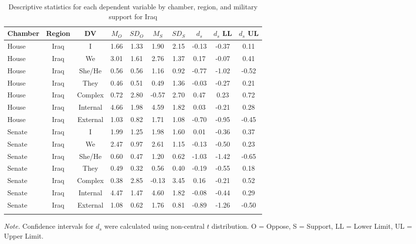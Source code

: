 \documentclass[english,,man,floatsintext]{apa6}
\begin{document}
\begin{table}[tbp]
\begin{center}
\begin{threeparttable}
\caption{\label{tab:Itable}Descriptive statistics for each dependent variable by chamber, 
          region, and military support for Iraq}
\small{
\begin{tabular}{lccccccccc}
\toprule
Chamber & Region & DV & $M_O$ & $SD_O$ & $M_S$ & $SD_S$ & $d_s$ & $d_s$ LL & $d_s$ UL\\
\midrule
House & Iraq & I & 1.66 & 1.33 & 1.90 & 2.15 & -0.13 & -0.37 & 0.11\\
House & Iraq & We & 3.01 & 1.61 & 2.76 & 1.37 & 0.17 & -0.07 & 0.41\\
House & Iraq & She/He & 0.56 & 0.56 & 1.16 & 0.92 & -0.77 & -1.02 & -0.52\\
House & Iraq & They & 0.46 & 0.51 & 0.49 & 1.36 & -0.03 & -0.27 & 0.21\\
House & Iraq & Complex & 0.72 & 2.80 & -0.57 & 2.70 & 0.47 & 0.23 & 0.72\\
House & Iraq & Internal & 4.66 & 1.98 & 4.59 & 1.82 & 0.03 & -0.21 & 0.28\\
House & Iraq & External & 1.03 & 0.82 & 1.71 & 1.08 & -0.70 & -0.95 & -0.45\\
Senate & Iraq & I & 1.99 & 1.25 & 1.98 & 1.60 & 0.01 & -0.36 & 0.37\\
Senate & Iraq & We & 2.47 & 0.97 & 2.61 & 1.15 & -0.13 & -0.50 & 0.23\\
Senate & Iraq & She/He & 0.60 & 0.47 & 1.20 & 0.62 & -1.03 & -1.42 & -0.65\\
Senate & Iraq & They & 0.49 & 0.32 & 0.56 & 0.40 & -0.19 & -0.55 & 0.18\\
Senate & Iraq & Complex & 0.38 & 2.85 & -0.13 & 3.45 & 0.16 & -0.21 & 0.52\\
Senate & Iraq & Internal & 4.47 & 1.47 & 4.60 & 1.82 & -0.08 & -0.44 & 0.29\\
Senate & Iraq & External & 1.08 & 0.62 & 1.76 & 0.81 & -0.89 & -1.26 & -0.50\\
\bottomrule
\addlinespace
\end{tabular}
}
\begin{tablenotes}[para]
\normalsize{\textit{Note.} Confidence intervals for $d_s$ were calculated using 
          non-central $t$ distribution. O = Oppose, S = Support, LL = Lower Limit, UL = Upper Limit.}
\end{tablenotes}
\end{threeparttable}
\end{center}
\end{table}
\end{document}
